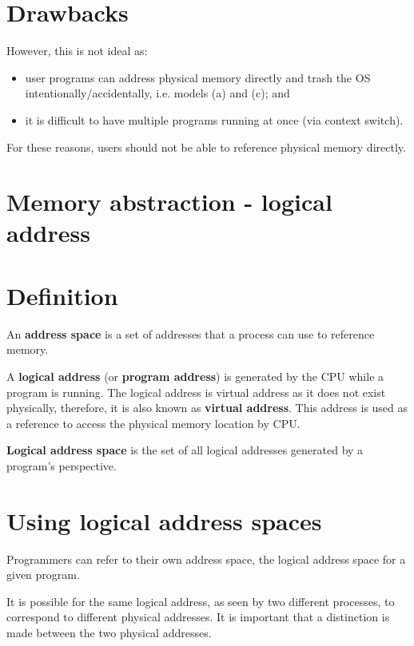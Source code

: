 \documentclass[a4paper]{systems-software}
\begin{document}
\section*{Drawbacks}

However, this is not ideal as:
\begin{itemize}
	\item user programs can address physical memory directly and trash the OS intentionally/accidentally, i.e. models (a) and (c); and
	\item it is difficult to have multiple programs running at once (via context switch).
\end{itemize}

For these reasons, users should not be able to reference physical memory directly.


\newpage

\section{Memory abstraction - logical address}

\section*{Definition}

An \textbf{address space} is a set of addresses that a process can use to reference memory.

A \textbf{logical address} (or \textbf{program address}) is generated by the CPU while a program is running. The logical address is virtual address as it does not exist physically, therefore, it is also known as \textbf{virtual address}. This address is used as a reference to access the physical memory location by CPU.

\textbf{Logical address space} is the set of all logical addresses generated by a program’s perspective.


\section*{Using logical address spaces}

Programmers can refer to their own address space, the logical address space for a given program.

It is possible for the same logical address, as seen by two different processes, to correspond to different physical addresses. It is important that a distinction is made between the two physical addresses.
\end{document}
